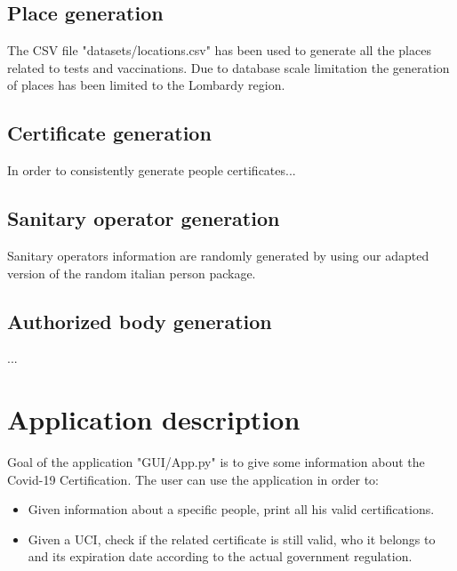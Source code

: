 \documentclass{article}
\begin{document}
\subsection{Place generation}
The CSV file {\selectfont"datasets/locations.csv"} has been used to generate all the places related to tests and vaccinations. Due to database scale limitation the generation of places has been limited to the Lombardy region.

\subsection{Certificate generation}
In order to consistently generate people certificates...

\subsection{Sanitary operator generation}
Sanitary operators information are randomly generated by using our adapted version of the random italian person package. 

\subsection{Authorized body generation}
...


\newpage
\section{Application description}
Goal of the application {\selectfont"GUI/App.py"} is to give some information about the Covid-19 Certification.
The user can use the application in order to:
\begin{itemize}
    \item Given information about a specific people, print all his valid certifications.
    \item Given a UCI, check if the related certificate is still valid, who it belongs to and its expiration date according to the actual government regulation.
\end{itemize}

\end{document}
